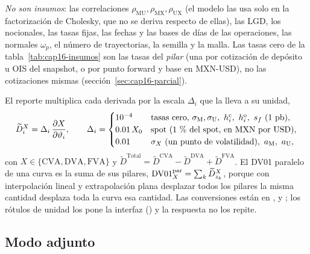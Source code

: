 \begin{sloppypar}
\emph{No son insumos}: las correlaciones $\rho_{\mathrm{MU}},\rho_{\mathrm{MX}},\rho_{\mathrm{UX}}$ (el modelo las usa solo
en la factorización de Cholesky, que no se deriva respecto de ellas), las LGD, los nocionales, las tasas fijas, las
fechas y las bases de días de las operaciones, las normales $\omega_p$, el número de trayectorias, la semilla y la
malla. Las tasas cero de la tabla~\ref{tab:cap16-insumos} son las tasas del \emph{pilar} (una por cotización de
depósito u OIS del snapshot, o por punto forward y base en MXN-USD), no las cotizaciones mismas
(sección~\ref{sec:cap16-parcial}).

El reporte multiplica cada derivada por la escala $\Delta_i$ que la lleva a su unidad,
\begin{equation}\label{eq:cap16-unidades}
  \widetilde D^{X}_i=\Delta_i\,\frac{\partial X}{\partial\vartheta_i},\qquad
  \Delta_i=\begin{cases}
    10^{-4} & \text{tasas cero, }\sigma_{\mathrm M},\sigma_{\mathrm U},\ h^{\mathrm c}_i,\ h^{\mathrm o}_i,\ s_f\ (1~\pb),\\
    0.01\,\Spot & \text{spot (1~\% del spot, en \MXN\ por \USD)},\\
    0.01 & \sigma_X\ (\text{un punto de volatilidad}),\ a_{\mathrm M},\ a_{\mathrm U},
  \end{cases}
\end{equation}
con $X\in\{\mathrm{CVA},\mathrm{DVA},\mathrm{FVA}\}$ y $\widetilde D^{\mathrm{Total}}=\widetilde D^{\mathrm{CVA}}-\widetilde D^{\mathrm{DVA}}+\widetilde D^{\mathrm{FVA}}$. El DV01 paralelo de una curva es
la suma de sus pilares, $\mathrm{DV01}^{\mathrm{par}}_X=\sum_k\widetilde D^{X}_{z_k}$, porque con interpolación lineal y
extrapolación plana desplazar todos los pilares la misma cantidad desplaza toda la curva esa cantidad. Las
conversiones están en ,  y
; los rótulos de unidad los pone la interfaz
() y la respuesta no los repite.

\subsection{Modo adjunto}\label{sec:cap16-adjunto}


\end{sloppypar}
